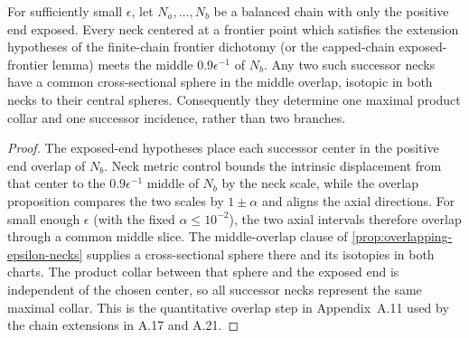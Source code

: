 \begin{lemma}
\label{lem:exposed-end-successor-overlap}
\notready
For sufficiently small $\epsilon$, let $N_a,\ldots,N_b$ be a balanced chain
with only the positive end exposed.  Every neck centered at a frontier point
which satisfies the extension hypotheses of the finite-chain frontier
dichotomy (or the capped-chain exposed-frontier lemma) meets the middle
$0.9\epsilon^{-1}$ of $N_b$.  Any two such successor necks have a common
cross-sectional sphere in the middle overlap, isotopic in both necks to their
central spheres.  Consequently they determine one maximal product collar and
one successor incidence, rather than two branches.
\end{lemma}

\begin{proof}
The exposed-end hypotheses place each successor center in the positive end
overlap of $N_b$.  Neck metric control bounds the intrinsic displacement from
that center to the $0.9\epsilon^{-1}$ middle of $N_b$ by the neck scale, while
the overlap proposition compares the two scales by $1\pm\alpha$ and aligns
the axial directions.  For small enough $\epsilon$ (with the fixed
$\alpha\le10^{-2}$), the two axial intervals therefore overlap through a
common middle slice.  The middle-overlap clause of
\ref{prop:overlapping-epsilon-necks} supplies a cross-sectional sphere there
and its isotopies in both charts.  The product collar between that sphere and
the exposed end is independent of the chosen center, so all successor necks
represent the same maximal collar.  This is the quantitative overlap step in
Appendix~A.11 used by the chain extensions in A.17 and A.21.
\end{proof}

